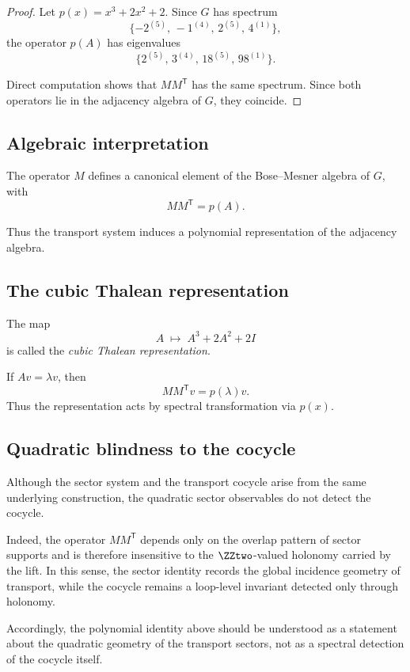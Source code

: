 \begin{proof}
Let $p(x)=x^3+2x^2+2$. Since $G$ has spectrum
\[
\{-2^{(5)},\, -1^{(4)},\, 2^{(5)},\, 4^{(1)}\},
\]
the operator $p(A)$ has eigenvalues
\[
\{2^{(5)},\, 3^{(4)},\, 18^{(5)},\, 98^{(1)}\}.
\]

Direct computation shows that $M M^{\mathsf T}$ has the same spectrum.
Since both operators lie in the adjacency algebra of $G$, they coincide.
\end{proof}

\subsection{Algebraic interpretation}

The operator $M$ defines a canonical element of the Bose--Mesner algebra
of $G$, with
\[
M M^{\mathsf T} = p(A).
\]

Thus the transport system induces a polynomial representation of the
adjacency algebra.

\subsection{The cubic Thalean representation}

\begin{definition}
The map
\[
A \;\mapsto\; A^3 + 2A^2 + 2I
\]
is called the \emph{cubic Thalean representation}.
\end{definition}

If $Av=\lambda v$, then
\[
M M^{\mathsf T}v = p(\lambda)v.
\]
Thus the representation acts by spectral transformation via $p(x)$.

\subsection{Quadratic blindness to the cocycle}

Although the sector system and the transport cocycle arise from the same
underlying construction, the quadratic sector observables do not detect
the cocycle.

Indeed, the operator $M M^{\mathsf T}$ depends only on the overlap
pattern of sector supports and is therefore insensitive to the
$\ZZtwo$-valued holonomy carried by the lift. In this sense, the sector
identity records the global incidence geometry of transport, while the
cocycle remains a loop-level invariant detected only through holonomy.

Accordingly, the polynomial identity above should be understood as a
statement about the quadratic geometry of the transport sectors, not as
a spectral detection of the cocycle itself.
